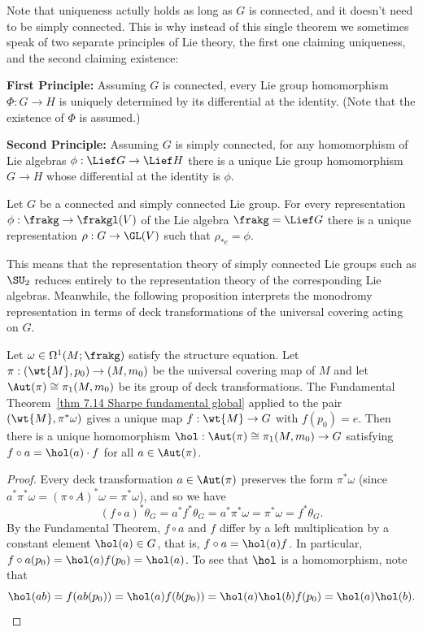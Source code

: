 \begin{rem}
    Note that uniqueness actully holds as long as $G$ is connected, and it doesn't need to be simply connected. This is why instead of this single theorem we sometimes speak of two separate principles of Lie theory, the first one claiming uniqueness, and the second claiming existence:

    \textbf{First Principle:} Assuming $G$ is connected, every Lie group homomorphism $\Phi:G\to H$ is uniquely determined by its differential at the identity. (Note that the existence of $\Phi$ is assumed.)

    \textbf{Second Principle:} Assuming $G$ is simply connected, for any homomorphism of Lie algebras $\phi:\Lief G\to \Lief H$ there is a unique Lie group homomorphism $G\to H$ whose differential at the identity is $\phi$.
\end{rem}

\begin{cor}\label{cor generated homomorphism}
    Let $G$ be a connected and simply connected Lie group. For every representation $\phi:\frakg\to \frakgl(V)$ of the Lie algebra $\frakg=\Lief G$ there is a unique representation $\rho:G\to \GL(V)$ such that $\rho_{\ast e}=\phi$.
\end{cor}

This means that the representation theory of simply connected Lie groups such as $\SU_2$ reduces entirely to the representation theory of the corresponding Lie algebras. Meanwhile, the following proposition interprets the monodromy representation in terms of deck transformations of the universal covering acting on $G$.

\begin{prop}\label{prop 8.1 Sharpe}
    Let $\omega\in\Omega^1(M;\frakg)$ satisfy the structure equation. Let $\pi:(\wt{M},p_0)\to (M,m_0)$ be the universal covering map of $M$ and let $\Aut(\pi)\cong \pi_1(M,m_0)$ be its group of deck transformations. The Fundamental Theorem~\ref{thm 7.14 Sharpe fundamental global} applied to the pair $(\wt{M},\pi^\ast\omega)$ gives a unique map $f:\wt{M}\to G$ with $f(p_0)=e$. Then there is a unique homomorphism $\hol: \Aut(\pi)\cong\pi_1(M,m_0)\to G$ satisfying $f\circ a=\hol(a)\cdot f$ for all $a\in\Aut(\pi)$.
\end{prop}
\begin{proof}
    Every deck transformation $a\in \Aut(\pi)$ preserves the form $\pi^\ast\omega$ (since $a^\ast \pi^\ast\omega=(\pi\circ A)^\ast\omega=\pi^\ast\omega$), and so we have
    \[(f\circ a)^\ast\theta_G=a^\ast f^\ast\theta_G=a^\ast \pi^\ast\omega=\pi^\ast\omega=f^\ast\theta_G.\]
    By the Fundamental Theorem, $f\circ a$ and $f$ differ by a left multiplication by a constant element $\hol(a)\in G$, that is, $f\circ a=\hol(a)f$. In particular, $f\circ a(p_0)=\hol(a)f(p_0)=\hol(a)$. To see that $\hol$ is a homomorphism, note that 
    \[\hol(ab)=f(ab(p_0))=\hol(a)f(b(p_0))=\hol(a)\hol(b)f(p_0)=\hol(a)\hol(b).\]
\end{proof}

